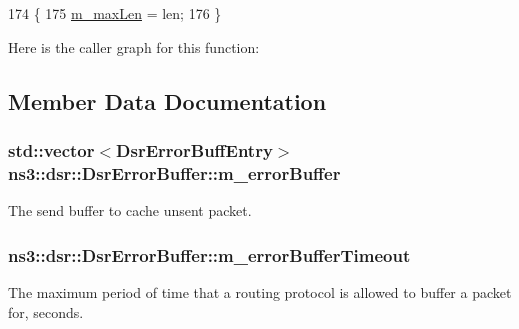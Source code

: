 \begin{DoxyCode}
174   \{
175     \hyperlink{classns3_1_1dsr_1_1DsrErrorBuffer_a1f9a6f0d47dfad68c8e51e318715d3d7}{m\_maxLen} = len;
176   \}
\end{DoxyCode}


Here is the caller graph for this function\+:




\subsection{Member Data Documentation}
\subsubsection[{\texorpdfstring{m\+\_\+error\+Buffer}{m_errorBuffer}}]{\setlength{\rightskip}{0pt plus 5cm}std\+::vector$<${\bf Dsr\+Error\+Buff\+Entry}$>$ ns3\+::dsr\+::\+Dsr\+Error\+Buffer\+::m\+\_\+error\+Buffer\hspace{0.3cm}{\ttfamily [private]}}\hypertarget{classns3_1_1dsr_1_1DsrErrorBuffer_ad12853345e28cfc3174432c2e4a59830}{}\label{classns3_1_1dsr_1_1DsrErrorBuffer_ad12853345e28cfc3174432c2e4a59830}


The send buffer to cache unsent packet. 

\subsubsection[{\texorpdfstring{m\+\_\+error\+Buffer\+Timeout}{m_errorBufferTimeout}}]{ ns3\+::dsr\+::\+Dsr\+Error\+Buffer\+::m\+\_\+error\+Buffer\+Timeout\hspace{0.3cm}{\ttfamily [private]}}\hypertarget{classns3_1_1dsr_1_1DsrErrorBuffer_a09ed5b125c6726bff8cf79b7569c864f}{}\label{classns3_1_1dsr_1_1DsrErrorBuffer_a09ed5b125c6726bff8cf79b7569c864f}


The maximum period of time that a routing protocol is allowed to buffer a packet for, seconds. 

